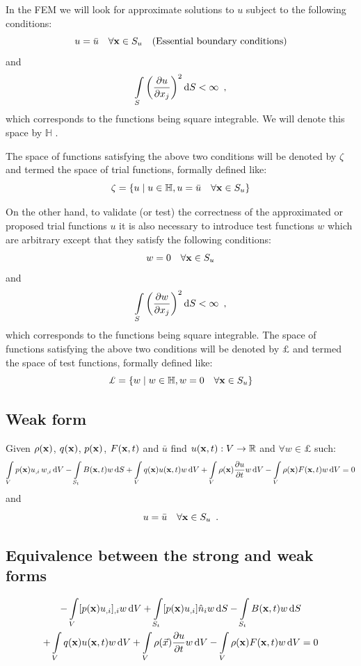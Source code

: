 In the FEM we will look for approximate solutions to $u$ subject to the following conditions:
\[u = \bar u \quad \forall \vb x \in S_u \quad \text{(Essential boundary conditions)}\] 
and
\[\int\limits_S \left(\pdv{u}{x_j}\right)^2 \dd{S} < \infty \enspace ,\]
which corresponds to the functions being square integrable. We will denote this space by $\mathbb{H}$ .

The space of functions satisfying the above two conditions will be denoted by $\zeta$ and termed the space of trial functions, formally defined like:
\[\zeta  = \left\{ u \mid u \in \mathbb{H},u = \bar u \quad \forall\vb x  \in S_u \right\}\]

On the other hand, to validate (or test) the correctness of the approximated or proposed trial functions $u$ it is also necessary to introduce test functions $w$ which are arbitrary except that they satisfy the following conditions:
\[w = 0\quad \forall \vb x \in S_u\] 
and
\[\int\limits_S \left(\pdv{w}{x_j}\right)^2 \dd{S} < \infty \enspace ,\]
which corresponds to the functions being square integrable. The space of functions satisfying the above two conditions will be denoted by $\pounds$ and termed the space of test functions, formally defined like:
\[\pounds  = \left\{w \mid w \in \mathbb{H},w = 0 \quad \forall \vb x \in S_u\right\}\]

\subsection*{Weak form}
Given $\rho(\vb x)$, $q(\vb x)$, $p(\vb x)$, $F(\vb x, t)$ and $\bar u$ find $u(\vb x , t):V \to \mathbb{R}$ and $\forall w \in \pounds$ such:
\[\int\limits_V p(\vb x) u_{,i}\, w_{,i}\dd{V} - \int\limits_{S_t} B(\vb x, t)w \dd{S}  + \int\limits_V q(\vb x)u(\vb x, t)w\dd{V}  + \int\limits_V \rho(\vb x)\pdv{u}{t}w \dd{V} - \int\limits_V \rho(\vb x) F(\vb x, t)w\dd{V} = 0\]
and
\[u = \bar u\quad \forall\vb x \in S_u \enspace .\]

\subsection*{Equivalence between the strong and weak forms}
\begin{multline}
    -\int\limits_V [p(\vb x)u_{,i}]_{,i}w \dd{V} + \int\limits_{S_t} [p(\vb x)u_{,i}] \hat n_i w\dd{S} - \int\limits_{S_t} B(\vb x, t)w\dd{S}\\
    + \int\limits_V q(\vb x)u(\vb x, t)w \dd{V}  + \int\limits_V \rho(\vec x)\pdv{u}{t}w\dd{V} - \int\limits_V \rho(\vb x)F(\vb x, t)w\dd{V} = 0 
\end{multline}

